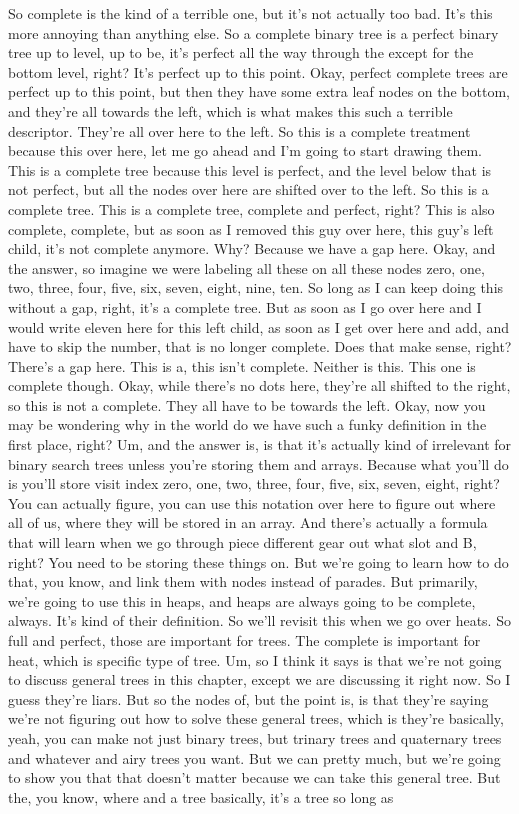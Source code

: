 So complete is the kind of a terrible one, but it's not actually too bad. It's this more annoying than anything else. So a complete binary tree is a perfect binary tree up to level, up to be, it's perfect all the way through the except for the bottom level, right? It's perfect up to this point. Okay, perfect complete trees are perfect up to this point, but then they have some extra leaf nodes on the bottom, and they're all towards the left, which is what makes this such a terrible descriptor. They're all over here to the left. So this is a complete treatment because this over here, let me go ahead and I'm going to start drawing them. This is a complete tree because this level is perfect, and the level below that is not perfect, but all the nodes over here are shifted over to the left. So this is a complete tree. This is a complete tree, complete and perfect, right? This is also complete, complete, but as soon as I removed this guy over here, this guy's left child, it's not complete anymore. Why? Because we have a gap here. Okay, and the answer, so imagine we were labeling all these on all these nodes zero, one, two, three, four, five, six, seven, eight, nine, ten. So long as I can keep doing this without a gap, right, it's a complete tree. But as soon as I go over here and I would write eleven here for this left child, as soon as I get over here and add, and have to skip the number, that is no longer complete. Does that make sense, right? There's a gap here. This is a, this isn't complete. Neither is this. This one is complete though. Okay, while there's no dots here, they're all shifted to the right, so this is not a complete. They all have to be towards the left. Okay, now you may be wondering why in the world do we have such a funky definition in the first place, right? Um, and the answer is, is that it's actually kind of irrelevant for binary search trees unless you're storing them and arrays. Because what you'll do is you'll store visit index zero, one, two, three, four, five, six, seven, eight, right? You can actually figure, you can use this notation over here to figure out where all of us, where they will be stored in an array. And there's actually a formula that will learn when we go through piece different gear out what slot and B, right? You need to be storing these things on. But we're going to learn how to do that, you know, and link them with nodes instead of parades. But primarily, we're going to use this in heaps, and heaps are always going to be complete, always. It's kind of their definition. So we'll revisit this when we go over heats. So full and perfect, those are important for trees. The complete is important for heat, which is specific type of tree. Um, so I think it says is that we're not going to discuss general trees in this chapter, except we are discussing it right now. So I guess they're liars. But so the nodes of, but the point is, is that they're saying we're not figuring out how to solve these general trees, which is they're basically, yeah, you can make not just binary trees, but trinary trees and quaternary trees and whatever and airy trees you want. But we can pretty much, but we're going to show you that that doesn't matter because we can take this general tree. But the, you know, where and a tree basically, it's a tree so long as 